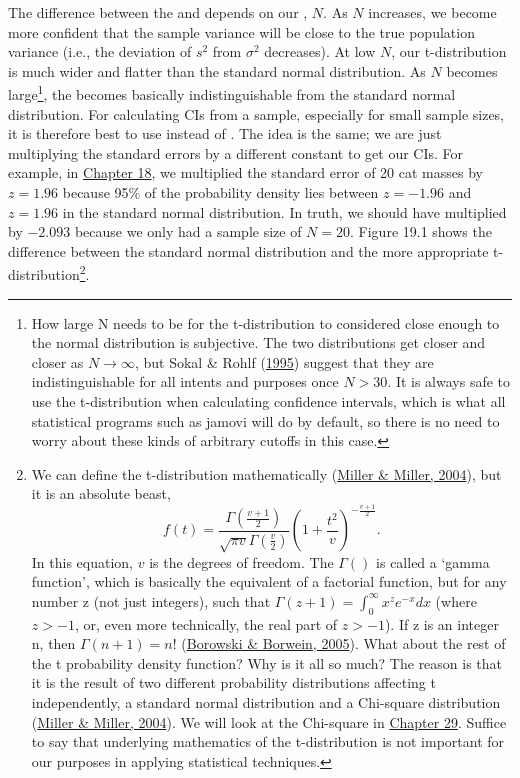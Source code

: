 \documentclass[
  openany]{krantz}
\begin{document}
The difference between the  and  depends on our , \(N\).
As \(N\) increases, we become more confident that the sample variance will be close to the true population variance (i.e., the deviation of \(s^{2}\) from \(\sigma^{2}\) decreases).
At low \(N\), our t-distribution is much wider and flatter than the standard normal distribution.
As \(N\) becomes large\footnote{How large N needs to be for the t-distribution to considered close enough to the normal distribution is subjective. The two distributions get closer and closer as \(N \to \infty\), but Sokal \& Rohlf (\protect\hyperlink{ref-Sokal1995}{1995}) suggest that they are indistinguishable for all intents and purposes once \(N > 30\). It is always safe to use the t-distribution when calculating confidence intervals, which is what all statistical programs such as jamovi will do by default, so there is no need to worry about these kinds of arbitrary cutoffs in this case.}, the  becomes basically indistinguishable from the standard normal distribution.
For calculating CIs from a sample, especially for small sample sizes, it is therefore best to use  instead of .
The idea is the same; we are just multiplying the standard errors by a different constant to get our CIs.
For example, in \protect\hyperlink{Chapter_18}{Chapter 18}, we multiplied the standard error of 20 cat masses by \(z = 1.96\) because 95\% of the probability density lies between \(z = -1.96\) and \(z = 1.96\) in the standard normal distribution.
In truth, we should have multiplied by \(-2.093\) because we only had a sample size of \(N = 20\).
Figure 19.1 shows the difference between the standard normal distribution and the more appropriate t-distribution\footnote{We can define the t-distribution mathematically (\protect\hyperlink{ref-Miller2004}{Miller \& Miller, 2004}), but it is an absolute beast, \[f(t) = \frac{\Gamma\left(\frac{v + 1}{2} \right)}{\sqrt{\pi v} \Gamma{\left(\frac{v}{2}\right)}}\left(1 + \frac{t^{2}}{v} \right)^{-\frac{v + 1}{2}}.\] In this equation, \(v\) is the degrees of freedom. The \(\Gamma\left(\right)\) is called a `gamma function', which is basically the equivalent of a factorial function, but for any number z (not just integers), such that \(\Gamma(z + 1) = \int_{0}^{\infty}x^{z}e^{-x}dx\) (where \(z > -1\), or, even more technically, the real part of \(z > -1\)). If z is an integer n, then \(\Gamma\left({n + 1}\right) = n!\) (\protect\hyperlink{ref-Borowski2005}{Borowski \& Borwein, 2005}). What about the rest of the t probability density function? Why is it all so much? The reason is that it is the result of two different probability distributions affecting t independently, a standard normal distribution and a Chi-square distribution (\protect\hyperlink{ref-Miller2004}{Miller \& Miller, 2004}). We will look at the Chi-square in \protect\hyperlink{Chapter_29}{Chapter 29}. Suffice to say that underlying mathematics of the t-distribution is not important for our purposes in applying statistical techniques.}.
\end{document}
